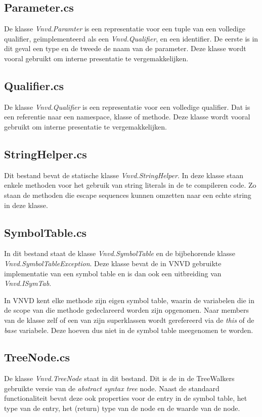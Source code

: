 \subsection{Parameter.cs}
De klasse \textit{Vnvd.Paramter} is een representatie voor een tuple van een volledige qualifier, ge\"implementeerd als een \textit{Vnvd.Qualifier}, en een identifier. De eerste is in dit geval een type en de tweede de naam van de parameter. Deze klasse wordt vooral gebruikt om interne presentatie te vergemakkelijken.

\subsection{Qualifier.cs}
De klasse \textit{Vnvd.Qualifier} is een representatie voor een volledige qualifier. Dat is een referentie naar een namespace, klasse of methode. Deze klasse wordt vooral gebruikt om interne presentatie te vergemakkelijken.

\subsection{StringHelper.cs}
Dit bestand bevat de statische klasse \textit{Vnvd.StringHelper}. In deze klasse staan enkele methoden voor het gebruik van string literals in de te compileren code. Zo staan de methoden die escape sequences kunnen omzetten naar een echte string in deze klasse.

\subsection{SymbolTable.cs}
In dit bestand staat de klasse \textit{Vnvd.SymbolTable} en de bijbehorende klasse \textit{Vnvd.SymbolTableException}. Deze klasse bevat de in VNVD gebruikte implementatie van een symbol table en is dan ook een uitbreiding van \textit{Vnvd.ISymTab}.

In VNVD kent elke methode zijn eigen symbol table, waarin de variabelen die in de scope van die methode gedeclareerd worden zijn opgenomen. Naar members van de klasse zelf of een van zijn superklassen wordt gerefereerd via de \textit{this} of de \textit{base} variabele. Deze hoeven dus niet in de symbol table meegenomen te worden.

\subsection{TreeNode.cs}
De klasse \textit{Vnvd.TreeNode} staat in dit bestand. Dit is de in de TreeWalkers gebruikte versie van de \textit{abstract syntax tree} node. Naast de standaard functionaliteit bevat deze ook properties voor de entry in de symbol table, het type van de entry, het (return) type van de node en de waarde van de node.

